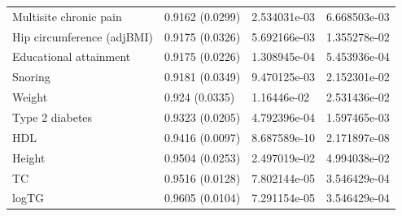 \documentclass{article}\usepackage[]{graphicx}\usepackage[dvipsnames]{xcolor}
\begin{document}
\begin{longtable}{p{6cm}|p{2.5cm}|p{2.5cm}|p{2.5cm}}
  Multisite chronic pain & 0.9162 (0.0299) & 2.534031e-03 & 6.668503e-03 \\ 
  Hip circumference (adjBMI) & 0.9175 (0.0326) & 5.692166e-03 & 1.355278e-02 \\ 
  Educational attainment & 0.9175 (0.0226) & 1.308945e-04 & 5.453936e-04 \\ 
  Snoring & 0.9181 (0.0349) & 9.470125e-03 & 2.152301e-02 \\ 
  Weight  & 0.924 (0.0335) & 1.16446e-02 & 2.531436e-02 \\ 
  Type 2 diabetes & 0.9323 (0.0205) & 4.792396e-04 & 1.597465e-03 \\ 
  HDL & 0.9416 (0.0097) & 8.687589e-10 & 2.171897e-08 \\ 
  Height  & 0.9504 (0.0253) & 2.497019e-02 & 4.994038e-02 \\ 
  TC & 0.9516 (0.0128) & 7.802144e-05 & 3.546429e-04 \\ 
  logTG & 0.9605 (0.0104) & 7.291154e-05 & 3.546429e-04 \\ 


   \hline
    \end{longtable}
\end{document}
